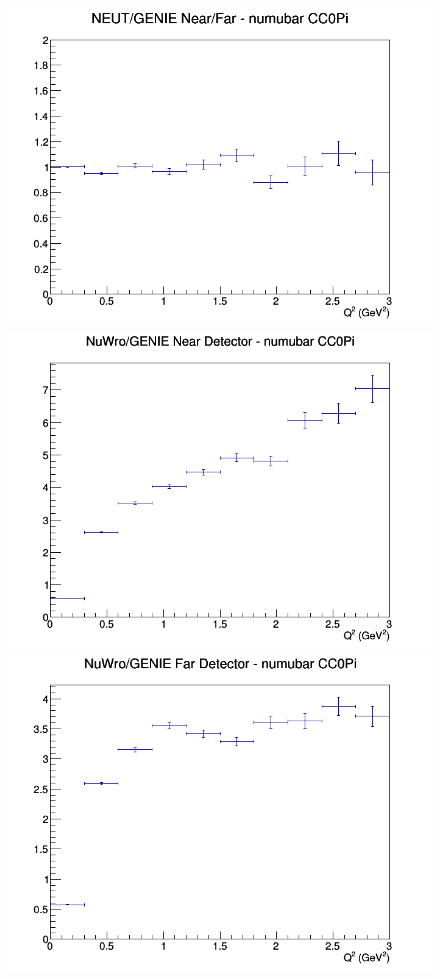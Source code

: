 \begin{figure}[h]
\endminipage
{}
\includegraphics[width=\linewidth]{eff_Q2/GAr/ratios/CC0Pi_NEUT_GENIE_numubar_NF_Q2.png}
\endminipage
\newline
{}
\includegraphics[width=\linewidth]{eff_Q2/GAr/ratios/CC0Pi_NuWro_GENIE_numubar_near_Q2.png}
\endminipage
{}
\includegraphics[width=\linewidth]{eff_Q2/GAr/ratios/CC0Pi_NuWro_GENIE_numubar_far_Q2.png}

\end{figure}
